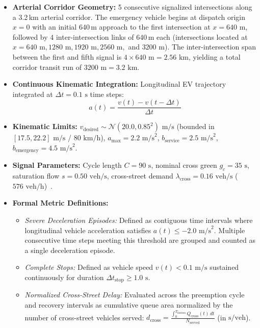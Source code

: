\documentclass[journal,10pt,twocolumn]{IEEEtran}
\begin{document}
\begin{itemize}
    \item \textbf{Arterial Corridor Geometry:} 5 consecutive signalized intersections along a 3.2\,km arterial corridor. The emergency vehicle begins at dispatch origin $x = 0$ with an initial 640\,m approach to the first intersection at $x = 640\text{ m}$, followed by 4 inter-intersection links of 640\,m each (intersections located at $x = 640\text{ m}, 1280\text{ m}, 1920\text{ m}, 2560\text{ m},$ and $3200\text{ m}$). The inter-intersection span between the first and fifth signal is $4 \times 640\text{ m} = 2.56\text{ km}$, yielding a total corridor transit run of $3200\text{ m} = 3.2\text{ km}$.
    \item \textbf{Continuous Kinematic Integration:} Longitudinal EV trajectory integrated at $\Delta t = 0.1\text{ s}$ time steps:
    \begin{equation}
    a(t) = \frac{v(t) - v(t - \Delta t)}{\Delta t}
    \end{equation}
    \item \textbf{Kinematic Limits:} $v_{\text{desired}} \sim \mathcal{N}(20.0, 0.85^2)\text{ m/s}$ (bounded in $[17.5, 22.2]\text{ m/s}$ / $80\text{ km/h}$), $a_{\max} = 2.2\text{ m/s}^2$, $b_{\text{service}} = 2.5\text{ m/s}^2$, $b_{\text{emergency}} = 4.5\text{ m/s}^2$.
    \item \textbf{Signal Parameters:} Cycle length $C = 90\text{ s}$, nominal cross green $g_c = 35\text{ s}$, saturation flow $s = 0.50\text{ veh/s}$, cross-street demand $\lambda_{\text{cross}} = 0.16\text{ veh/s}$ ($576\text{ veh/h}$)~\cite{irc1994}.
    \item \textbf{Formal Metric Definitions:}
    \begin{itemize}
        \item \emph{Severe Deceleration Episodes:} Defined as contiguous time intervals where longitudinal vehicle acceleration satisfies $a(t) \le -2.0\text{ m/s}^2$. Multiple consecutive time steps meeting this threshold are grouped and counted as a single deceleration episode.
        \item \emph{Complete Stops:} Defined as vehicle speed $v(t) < 0.1\text{ m/s}$ sustained continuously for duration $\Delta t_{\text{stop}} \ge 1.0\text{ s}$.
        \item \emph{Normalized Cross-Street Delay:} Evaluated across the preemption cycle and recovery intervals as cumulative queue area normalized by the number of cross-street vehicles served: $d_{\text{cross}} = \frac{\int_0^{T_{\text{horizon}}} Q_{\text{cross}}(t)\,dt}{N_{\text{served}}}$ (in $\text{s/veh}$).

\end{itemize}
\end{itemize}
\end{document}
